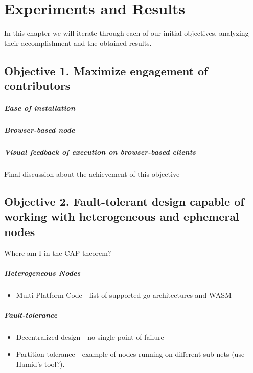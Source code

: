 \chapter{Experiments and Results}

In this chapter we will iterate through each of our initial objectives, analyzing their accomplishment and the obtained results.

\section{Objective 1. Maximize engagement of contributors}

\paragraph*{Ease of installation}
\paragraph*{Browser-based node}
\paragraph*{Visual feedback of execution on browser-based clients} 

Final discussion about the achievement of this objective



\section{Objective 2. Fault-tolerant design capable of working with heterogeneous and ephemeral nodes}

Where am I in the CAP theorem?

\paragraph*{Heterogeneous Nodes}
\begin{itemize}
	\item Multi-Platform Code - list of supported go architectures and WASM
\end{itemize}

\paragraph*{Fault-tolerance}
\begin{itemize}
	\item Decentralized design - no single point of failure
	\item Partition tolerance - example of nodes running on different sub-nets (use Hamid's tool?).
\end{itemize}

